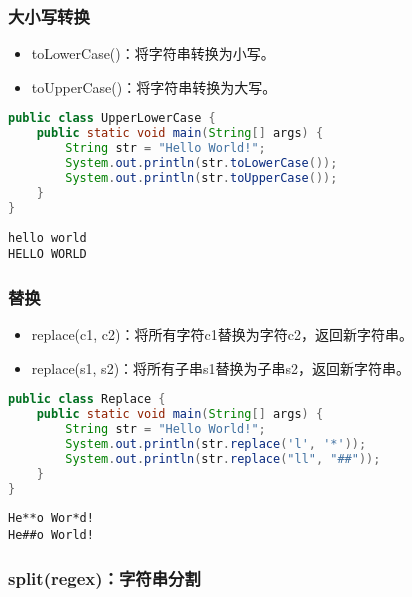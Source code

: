 \subsubsection{大小写转换}

\begin{itemize}
	\item toLowerCase()：将字符串转换为小写。
	\item toUpperCase()：将字符串转换为大写。
\end{itemize}


\begin{lstlisting}[language=Java]
public class UpperLowerCase {
	public static void main(String[] args) {
		String str = "Hello World!";
		System.out.println(str.toLowerCase());
		System.out.println(str.toUpperCase());
	}
}
\end{lstlisting}

\begin{tcolorbox}
	\begin{verbatim}
hello world
HELLO WORLD
	\end{verbatim}
\end{tcolorbox}

\subsubsection{替换}

\begin{itemize}
	\item replace(c1, c2)：将所有字符c1替换为字符c2，返回新字符串。
	\item replace(s1, s2)：将所有子串s1替换为子串s2，返回新字符串。
\end{itemize}


\begin{lstlisting}[language=Java]
public class Replace {
	public static void main(String[] args) {
		String str = "Hello World!";
		System.out.println(str.replace('l', '*'));
		System.out.println(str.replace("ll", "##"));
	}
}
\end{lstlisting}

\begin{tcolorbox}
	\begin{verbatim}
He**o Wor*d!
He##o World!
	\end{verbatim}
\end{tcolorbox}

\subsubsection{split(regex)：字符串分割}


